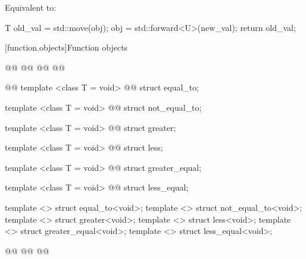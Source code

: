 \begin{itemdescr}
\pnum
\effects
Equivalent to:

\begin{codeblock}
T old_val = std::move(obj);
obj = std::forward<U>(new_val);
return old_val;
\end{codeblock}
\end{itemdescr}

[function.objects]{Function objects}

\pnum
{}

\begin{codeblock}
@@
  @@
  @@
  @@

  @@
  template <class T = void>
    @@
  struct equal_to;

  template <class T = void>
    @@
  struct not_equal_to;

  template <class T = void>
    @@
  struct greater;

  template <class T = void>
    @@
  struct less;

  template <class T = void>
    @@
  struct greater_equal;

  template <class T = void>
    @@
  struct less_equal;

  template <> struct equal_to<void>;
  template <> struct not_equal_to<void>;
  template <> struct greater<void>;
  template <> struct less<void>;
  template <> struct greater_equal<void>;
  template <> struct less_equal<void>;

  @@
  @@
@\added{\}\}\}\}}@
\end{codeblock}

